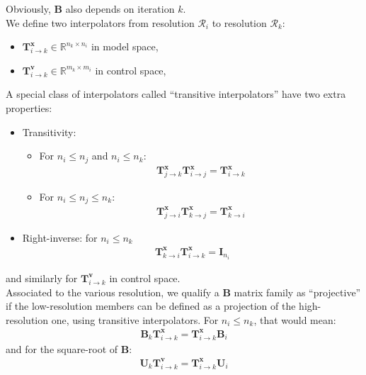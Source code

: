 \documentclass[12pt]{scrartcl}
\begin{document}
Obviously, $\mathbf{B}$ also depends on iteration $k$.\\
$  $\\
We define two interpolators from resolution $\mathcal{R}_i$ to resolution $\mathcal{R}_k$:
\begin{itemize}
\item $\mathbf{T}^\mathbf{x}_{i \rightarrow k} \in \mathbb{R}^{n_k \times n_i}$ in model space,
\item $\mathbf{T}^\mathbf{v}_{i \rightarrow k} \in \mathbb{R}^{m_k \times m_i}$ in control space,
\end{itemize}
$  $\\
A special class of interpolators called ``transitive interpolators'' have two extra properties:
\begin{itemize}
\item Transitivity:
\begin{itemize}
\item For $n_i \le n_j$ and $n_i \le n_k$:
\begin{align}
\mathbf{T}^\mathbf{x}_{j \rightarrow k} \mathbf{T}^\mathbf{x}_{i \rightarrow j} = \mathbf{T}^\mathbf{x}_{i \rightarrow k}
\end{align}
\item For $n_i \le n_j \le n_k$:
\begin{align}
\mathbf{T}^\mathbf{x}_{j \rightarrow i} \mathbf{T}^\mathbf{x}_{k \rightarrow j} = \mathbf{T}^\mathbf{x}_{k \rightarrow i}
\end{align}
\end{itemize}
\item Right-inverse: for $n_i \le n_k$
\begin{align}
\mathbf{T}^\mathbf{x}_{k \rightarrow i} \mathbf{T}^\mathbf{x}_{i \rightarrow k} = \mathbf{I}_{n_i}
\end{align}
\end{itemize}
and similarly for $\mathbf{T}^\mathbf{v}_{i \rightarrow k}$ in control space.\\
$  $\\
Associated to the various resolution, we qualify a $\mathbf{B}$ matrix family as ``projective'' if the low-resolution members can be defined as a projection of the high-resolution one, using transitive interpolators. For $n_i \le n_k$, that would mean:
\begin{align}
\mathbf{B}_k \mathbf{T}^\mathbf{x}_{i \rightarrow k} = \mathbf{T}^\mathbf{x}_{i \rightarrow k} \mathbf{B}_i
\end{align}
and for the square-root of $\mathbf{B}$:
\begin{align}
\mathbf{U}_k \mathbf{T}^\mathbf{v}_{i \rightarrow k} = \mathbf{T}^\mathbf{x}_{i \rightarrow k} \mathbf{U}_i
\end{align}
\end{document}
